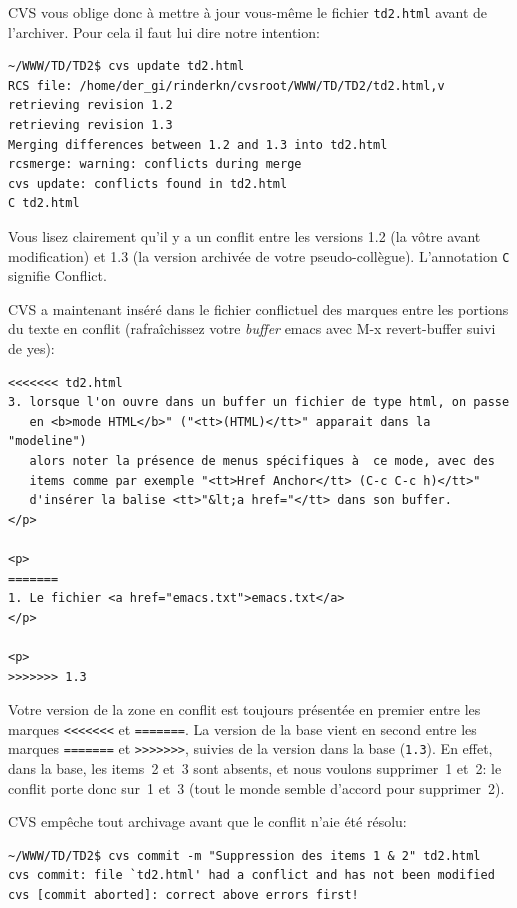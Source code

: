 \documentclass[11pt,a4paper]{article}
\begin{document}
\noindent CVS vous oblige donc à mettre à jour vous-même le fichier
\texttt{td2.html} avant de l'archiver. Pour cela il faut lui dire
notre intention:

{\small
\begin{verbatim}
~/WWW/TD/TD2$ cvs update td2.html
RCS file: /home/der_gi/rinderkn/cvsroot/WWW/TD/TD2/td2.html,v
retrieving revision 1.2
retrieving revision 1.3
Merging differences between 1.2 and 1.3 into td2.html
rcsmerge: warning: conflicts during merge
cvs update: conflicts found in td2.html
C td2.html
\end{verbatim}
}

Vous lisez clairement qu'il y a un conflit entre les versions 1.2 (la
vôtre avant modification) et 1.3 (la version archivée de votre
pseudo-collègue). L'annotation \texttt{C} signifie \textsf{Conflict}.

CVS a maintenant inséré dans le fichier conflictuel des marques entre
les portions du texte en conflit (rafraîchissez votre \emph{buffer}
emacs avec \textsf{M-x revert-buffer} suivi de \textsf{yes}):

{\small
\begin{verbatim}
<<<<<<< td2.html
3. lorsque l'on ouvre dans un buffer un fichier de type html, on passe
   en <b>mode HTML</b>" ("<tt>(HTML)</tt>" apparait dans la "modeline")
   alors noter la présence de menus spécifiques à  ce mode, avec des
   items comme par exemple "<tt>Href Anchor</tt> (C-c C-c h)</tt>"
   d'insérer la balise <tt>"&lt;a href="</tt> dans son buffer.
</p>

<p>
=======
1. Le fichier <a href="emacs.txt">emacs.txt</a>
</p>

<p>
>>>>>>> 1.3
\end{verbatim}
}

Votre version de la zone en conflit est toujours présentée en premier
entre les marques \verb|<<<<<<<| et \verb|=======|. La version de la
base vient en second entre les marques \verb|=======| et
\verb|>>>>>>>|, suivies de la version dans la base (\texttt{1.3}). En
effet, dans la base, les items~2 et~3 sont absents, et nous voulons
supprimer~1 et~2: le conflit porte donc sur~1 et~3 (tout le monde
semble d'accord pour supprimer~2).

CVS empêche tout archivage avant que le conflit n'aie été résolu:

{\small
\begin{verbatim}
~/WWW/TD/TD2$ cvs commit -m "Suppression des items 1 & 2" td2.html
cvs commit: file `td2.html' had a conflict and has not been modified
cvs [commit aborted]: correct above errors first!
\end{verbatim}
}
\end{document}
